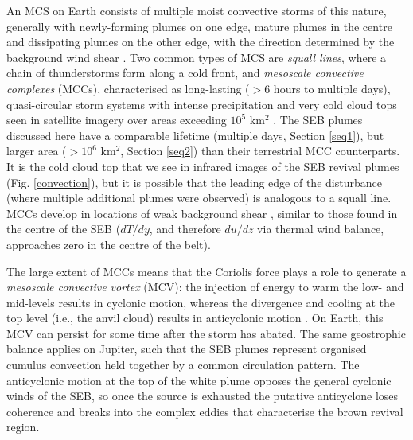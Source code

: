 \documentclass[final,authoryear,5p,times,twocolumn]{elsarticle}
\begin{document}
An MCS on Earth consists of multiple moist convective storms of this nature, generally with newly-forming plumes on one edge, mature plumes in the centre and dissipating plumes on the other edge, with the direction determined by the background wind shear \citep{93houze, 04houze}.  Two common types of MCS are \textit{squall lines}, where a chain of thunderstorms form along a cold front, and \textit{mesoscale convective complexes} (MCCs), characterised as long-lasting ($>6$ hours to multiple days), quasi-circular storm systems with intense precipitation and very cold cloud tops seen in satellite imagery over areas exceeding $10^5$ km$^2$ \citep{93houze}.  The SEB plumes discussed here have a comparable lifetime (multiple days, Section \ref{seq1}), but larger area ($>10^6$ km$^2$, Section \ref{seq2}) than their terrestrial MCC counterparts.  It is the cold cloud top that we see in infrared images of the SEB revival plumes (Fig. \ref{convection}), but it is possible that the leading edge of the disturbance (where multiple additional plumes were observed) is analogous to a squall line.  MCCs develop in locations of weak background shear \citep{04houze}, similar to those found in the centre of the SEB ($dT/dy$, and therefore $du/dz$ via thermal wind balance, approaches zero in the centre of the belt). 

The large extent of MCCs means that the Coriolis force plays a role to generate a \textit{mesoscale convective vortex} (MCV):  the injection of energy to warm the low- and mid-levels results in cyclonic motion, whereas the divergence and cooling at the top level (i.e., the anvil cloud) results in anticyclonic motion \citep{94emanuel, 06wallace}.  On Earth, this MCV can persist for some time after the storm has abated.  The same geostrophic balance applies on Jupiter, such that the SEB plumes represent organised cumulus convection held together by a common circulation pattern.  The anticyclonic motion at the top of the white plume opposes the general cyclonic winds of the SEB, so once the source is exhausted the putative anticyclone loses coherence \citep{02hueso} and breaks into the complex eddies that characterise the brown revival region.
\end{document}
